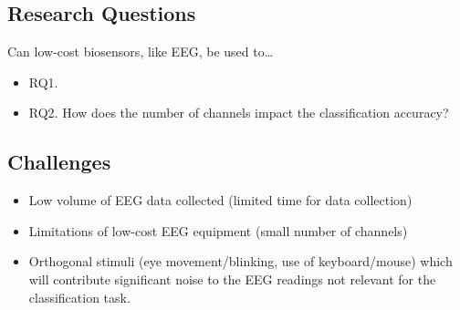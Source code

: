 \documentclass{IEEEtran}
\begin{document}
\begin{refsection}



\subsection{Research Questions}


Can low-cost biosensors, like EEG, be used to\ldots

\begin{itemize}
    \item RQ1. \RQmain
    \item RQ2. How does the number of channels impact the classification accuracy?
\end{itemize}

\subsection{Challenges}

\begin{itemize}
    \item Low volume of EEG data collected (limited time for data collection)
    \item Limitations of low-cost EEG equipment (small number of channels)
    \item Orthogonal stimuli (eye movement/blinking, use of keyboard/mouse) which will contribute significant noise to the EEG readings not relevant for the classification task.
\end{itemize}


\end{refsection}
\end{document}
